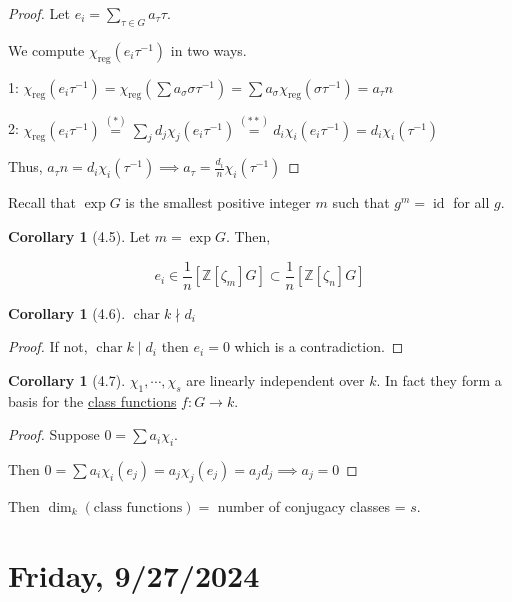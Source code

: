\documentclass{article}
\theoremstyle{definition}
\newtheorem{corollary}[theorem]{Corollary}
\newcommand{\Char}{\operatorname{char}}
\begin{document}
\begin{proof}
    Let \(e_i = \sum_{\tau \in G} a_\tau \tau \).
    
    We compute \(\chi_{\text{reg}}(e_i \tau ^{-1})\) in two ways.
    
    1: \(\chi_{\text{reg}}(e_i \tau ^{-1} ) = \chi_{\text{reg}}(\sum a_\sigma \sigma \tau ^{-1}) = \sum a_\sigma \chi_{\text{reg}}(\sigma \tau ^{-1}) = a_{\tau}n\)
    
    2: \(\chi_{\text{reg}}(e_i \tau ^{-1}) \overset{(\ast)}{=} \sum_{j} d_j \chi_j (e_i \tau ^{-1}) \overset{(\ast\ast)}{=} d_i \chi_i (e_i \tau ^{-1}) = d_i \chi_i (\tau ^{-1}) \)
    
    Thus, \(a_\tau n = d_i \chi_i (\tau ^{-1}) \implies a_\tau = \frac{d_i}{n} \chi_i (\tau ^{-1})\) 
\end{proof}

Recall that \(\exp G\) is the smallest positive integer \(m\) such that \(g^m = \operatorname{id}\) for all \(g\).

\begin{corollary}
    [4.5] Let \(m = \exp G\). Then, 

    \[
        e_i \in \frac{1}{n} \left[ \mathbb{Z} [\zeta_m] G \right] \subset \frac{1}{n} \left[ \mathbb{Z} [\zeta_n] G \right]
    \]
\end{corollary}

\begin{corollary}
    [4.6] \(\Char k \nmid d_i\) 
\end{corollary}

\begin{proof}
    If not, \(\Char k \mid d_i\) then \(e_i = 0\) which is a contradiction. 
\end{proof}

\begin{corollary}
    [4.7] \(\chi_1, \cdots , \chi_s\) are linearly independent over \(k\). In fact they form a basis for the \underline{class functions} \(f: G \to k\). 
\end{corollary}

\begin{proof}
    Suppose \(0 = \sum a_i \chi_i\). 

    Then \(0 = \sum a_i \chi_i(e_j) = a_j \chi_j (e_j) = a_j d_j \implies a_j = 0\) 
\end{proof}

Then \(\dim_k(\text{class functions}) = \) number of conjugacy classes = \(s\). 


\section*{Friday, 9/27/2024}
\end{document}

